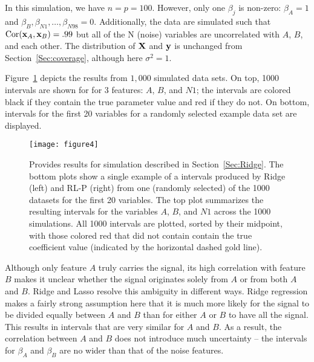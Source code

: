 In this simulation, we have $n = p = 100$. However, only one $\beta_j$ is non-zero: $\beta_{A} = 1$ and $\beta_{B}, \beta_{N1}, \ldots, \beta_{N98} = 0$. Additionally, the data are simulated such that $\textrm{Cor}(\mathbf{x}_{A}, \mathbf{x}_{B}) = .99$ but all of the N (noise) variables are uncorrelated with $A$, $B$, and each other. The distribution of $\mathbf{X}$ and $\mathbf{y}$ is unchanged from Section~\ref{Sec:coverage}, although here $\sigma^2 = 1$.

Figure~\ref{fig:4} depicts the results from $1,000$ simulated data sets. On top, 1000 intervals are shown for for 3 features: $A$, $B$, and $N1$; the intervals are colored black if they contain the true parameter value and red if they do not. On bottom, intervals for the first 20 variables for a randomly selected example data set are displayed.

\begin{figure}[htb!]
  \begin{center}
    \texttt{[image: figure4]}
    \caption{\label{fig:4}
      Provides results for simulation described in Section~\ref{Sec:Ridge}. The bottom plots show a single example of a intervals produced by Ridge (left) and RL-P (right) from one (randomly selected) of the 1000 datasets for the first 20 variables. The top plot summarizes the resulting intervals for the variables $A$, $B$, and $N1$ across the 1000 simulations. All 1000 intervals are plotted, sorted by their midpoint, with those colored red that did not contain contain the true coefficient value (indicated by the horizontal dashed gold line).
    }
  \end{center}
\end{figure}

Although only feature $A$ truly carries the signal, its high correlation with feature $B$ makes it unclear whether the signal originates solely from $A$ or from both $A$ and $B$. Ridge and Lasso resolve this ambiguity in different ways. Ridge regression makes a fairly strong assumption here that it is much more likely for the signal to be divided equally between $A$ and $B$ than for either $A$ or $B$ to have all the signal. This results in intervals that are very similar for $A$ and $B$. As a result, the correlation between $A$ and $B$ does not introduce much uncertainty -- the intervals for $\beta_A$ and $\beta_B$ are no wider than that of the noise features.


